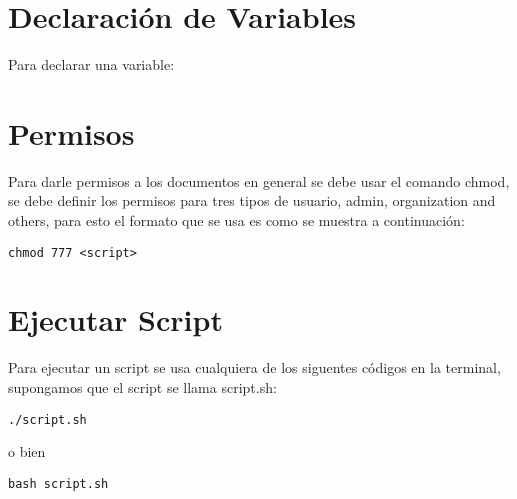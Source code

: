 \section{Declaraci\'on de Variables}

Para declarar una variable:



\section{Permisos}

Para darle permisos a los documentos en general se debe usar el comando chmod, se debe definir los permisos para tres tipos de usuario, admin, organization and others, para esto el formato que se usa es como se muestra a continuaci\'on:

\begin{lstlisting}[numbers=none]
  chmod 777 <script>
\end{lstlisting}

\section{Ejecutar Script}

Para ejecutar un script se usa cualquiera de los siguentes c\'odigos en la terminal, supongamos que el script se llama script.sh:


\begin{lstlisting}[numbers=none]
  ./script.sh
\end{lstlisting}

o bien

\begin{lstlisting}[numbers=none]
  bash script.sh
\end{lstlisting}


